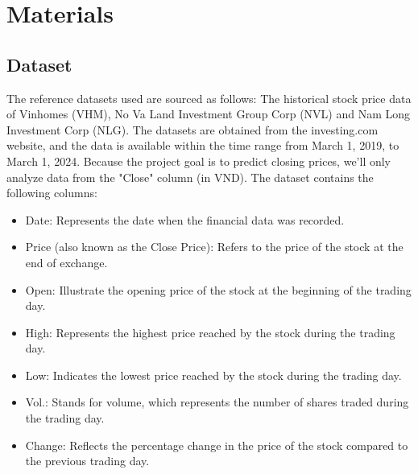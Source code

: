 \documentclass{ieeeojies}
\begin{document}
	\section{Materials}
	\subsection{Dataset}
	The reference datasets used are sourced as follows: The historical stock price data of Vinhomes (VHM), No Va Land Investment Group Corp (NVL) and Nam Long Investment Corp (NLG). The datasets are obtained from the investing.com website, and the data is available within the time range from March 1, 2019, to March 1, 2024. Because the project goal is to predict closing prices, we'll only analyze data from the "Close" column (in VND). The dataset contains the following columns:
	\begin{itemize}
		\item Date: Represents the date when the financial data was recorded.
		\item Price (also known as the Close Price): Refers to the price of the stock at the end of
		exchange.
		\item Open: Illustrate the opening price of the stock at the beginning of the trading day.
		\item High: Represents the highest price reached by the stock during the trading day.
		\item Low: Indicates the lowest price reached by the stock during the trading day.
		\item Vol.: Stands for volume, which represents the number of shares traded during the
		trading day.
		\item Change: Reflects the percentage change in the price of the stock compared to the
		previous trading day.
	\end{itemize}
\end{document}
